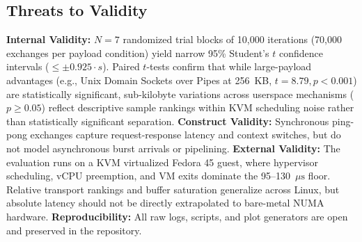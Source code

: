 \subsection{Threats to Validity}
\textbf{Internal Validity:} $N = 7$ randomized trial blocks of 10,000 iterations (70,000 exchanges per payload condition) yield narrow 95\% Student's $t$ confidence intervals ($\le \pm 0.925 \cdot s$). Paired $t$-tests confirm that while large-payload advantages (e.g., Unix Domain Sockets over Pipes at 256~KB, $t=8.79, p < 0.001$) are statistically significant, sub-kilobyte variations across userspace mechanisms ($p \ge 0.05$) reflect descriptive sample rankings within KVM scheduling noise rather than statistically significant separation.
\textbf{Construct Validity:} Synchronous ping-pong exchanges capture request-response latency and context switches, but do not model asynchronous burst arrivals or pipelining.
\textbf{External Validity:} The evaluation runs on a KVM virtualized Fedora 45 guest, where hypervisor scheduling, vCPU preemption, and VM exits dominate the 95--130~$\mu\text{s}$ floor. Relative transport rankings and buffer saturation generalize across Linux, but absolute latency should not be directly extrapolated to bare-metal NUMA hardware.
\textbf{Reproducibility:} All raw logs, scripts, and plot generators are open and preserved in the repository.

